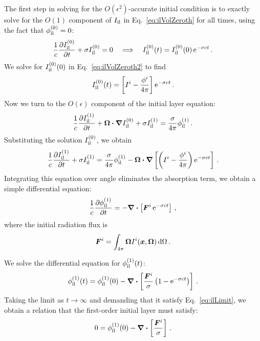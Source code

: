 The first step in solving for the $O(\epsilon^2)$-accurate initial condition is
to exactly solve for the $O(1)$ component of $I_\mathrm{il}$ in
Eq.~\eqref{eq:ilVolZeroth} for all times, using the fact that $\phi_\mathrm{il}^{(0)}=0$:
\begin{equation*}
  \frac{1}{c}\frac{\partial I_\mathrm{il}^{(0)}}{\partial t} + \sigma I_\mathrm{il}^{(0)} = 0
  \quad \Longrightarrow \quad I_\mathrm{il}^{(0)}(t) = I_\mathrm{il}^{(0)}(0) \mathop{}\!\mathrm{e}^{-\sigma c t} \,.
\end{equation*}
We solve for $I_\mathrm{il}^{(0)}(0)$ in Eq.~\eqref{eq:ilVolZeroth2} to find
\begin{equation*}
 I_\mathrm{il}^{(0)}(t) = \left[ I^i - \frac{\phi^i}{4\pi} \right] \mathop{}\!\mathrm{e}^{-\sigma c t}\,.
\end{equation*}
Now we turn to the $O(\epsilon)$ component of the initial layer equation:
\begin{equation*}
  \frac{1}{c}\frac{\partial I_\mathrm{il}^{(1)}}{\partial t}
  + \bm{\Omega}\bm{\cdot} \bm{\nabla} I_\mathrm{il}^{(0)}
  + \sigma I_\mathrm{il}^{(1)}
  = \frac{\sigma}{4\pi} \phi_\mathrm{il}^{(1)} \,.
\end{equation*}
Substituting the solution $I_\mathrm{il}^{(0)}$, we obtain
\begin{equation*}
  \frac{1}{c}\frac{\partial I_\mathrm{il}^{(1)}}{\partial t}
  + \sigma I_\mathrm{il}^{(1)}
  = \frac{\sigma}{4\pi} \phi_\mathrm{il}^{(1)}
  -  \bm{\Omega}\bm{\cdot} \bm{\nabla} \left[\left(  I^i - \frac{\phi^i}{4\pi} \right)
    \mathop{}\!\mathrm{e}^{-\sigma c t} \right] \,.
\end{equation*}
Integrating this equation over angle eliminates the absorption
term, we obtain a simple differential equation:
\begin{equation*}
  \frac{1}{c}\frac{\partial \phi_\mathrm{il}^{(1)}}{\partial t}
  = - \bm{\nabla} \bm{\cdot} \left[\bm{F}^i \mathop{}\!\mathrm{e}^{-\sigma c t} \right] \,,
\end{equation*}
where the initial radiation flux is
\begin{equation*}
  \bm{F}^i = \int_{4\pi} \bm{\Omega} I^i(\bm{x},\bm{\Omega})\mathop{}\!\mathrm{d}\Omega\,.
\end{equation*}

We solve the differential equation for $\phi_\mathrm{il}^{(1)}(t)$:
\begin{equation*}
  \phi_\mathrm{il}^{(1)}(t) = \phi_\mathrm{il}^{(1)}(0) - \bm{\nabla} \bm{\cdot} \left[\frac{\bm{F}^i}{\sigma}
    \left( 1 - \mathop{}\!\mathrm{e}^{-\sigma c t} \right) \right] \,.
\end{equation*}
Taking the limit as $t\to\infty$ and demanding that it satisfy
Eq.~\eqref{eq:ilLimit}, we obtain a relation that the first-order initial
layer must satisfy:
\begin{equation}\label{eq:ilVolFirst3}
  0 = \phi_\mathrm{il}^{(1)}(0) - \bm{\nabla} \bm{\cdot} \left[\frac{\bm{F}^i}{\sigma} \right] \,.
\end{equation}

